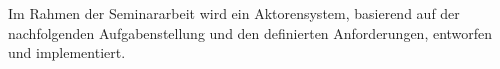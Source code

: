 Im Rahmen der Seminararbeit wird ein Aktorensystem, basierend auf der nachfolgenden Aufgabenstellung und den definierten Anforderungen, entworfen und implementiert.
